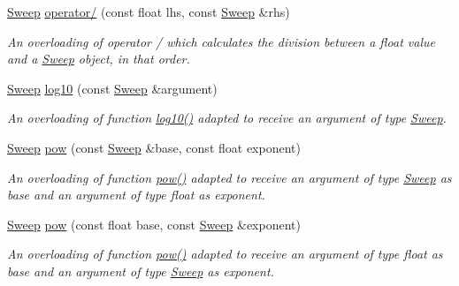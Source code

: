 \begin{DoxyCompactItemize}
\mbox{\label{structSweep_abe3c133bf246f7faebcfda286c5e1448}} 
\hyperlink{structSweep}{Sweep} \hyperlink{structSweep_abe3c133bf246f7faebcfda286c5e1448}{operator/} (const float lhs, const \hyperlink{structSweep}{Sweep} \&rhs)
\begin{DoxyCompactList}\small\item\em An overloading of operator / which calculates the division between a {\itshape float} value and a {\itshape \hyperlink{structSweep}{Sweep}} object, in that order. \end{DoxyCompactList}\item 
\mbox{\label{structSweep_a37df38f37b1cf6a6bfb18f44b706d308}} 
\hyperlink{structSweep}{Sweep} \hyperlink{structSweep_a37df38f37b1cf6a6bfb18f44b706d308}{log10} (const \hyperlink{structSweep}{Sweep} \&argument)
\begin{DoxyCompactList}\small\item\em An overloading of function {\ttfamily \hyperlink{structSweep_a37df38f37b1cf6a6bfb18f44b706d308}{log10()}} adapted to receive an argument of type {\itshape \hyperlink{structSweep}{Sweep}}. \end{DoxyCompactList}\item 
\mbox{\label{structSweep_a09ee88cfc9b28e6ec344eea1a2817ea9}} 
\hyperlink{structSweep}{Sweep} \hyperlink{structSweep_a09ee88cfc9b28e6ec344eea1a2817ea9}{pow} (const \hyperlink{structSweep}{Sweep} \&base, const float exponent)
\begin{DoxyCompactList}\small\item\em An overloading of function {\ttfamily \hyperlink{structSweep_a09ee88cfc9b28e6ec344eea1a2817ea9}{pow()}} adapted to receive an argument of type {\itshape \hyperlink{structSweep}{Sweep}} as base and an argument of type {\itshape float} as exponent. \end{DoxyCompactList}\item 
\mbox{\label{structSweep_a879ae44efd2611562d05b90b24099e70}} 
\hyperlink{structSweep}{Sweep} \hyperlink{structSweep_a879ae44efd2611562d05b90b24099e70}{pow} (const float base, const \hyperlink{structSweep}{Sweep} \&exponent)
\begin{DoxyCompactList}\small\item\em An overloading of function {\ttfamily \hyperlink{structSweep_a09ee88cfc9b28e6ec344eea1a2817ea9}{pow()}} adapted to receive an argument of type {\itshape float} as base and an argument of type {\itshape \hyperlink{structSweep}{Sweep}} as exponent. \end{DoxyCompactList}\end{DoxyCompactItemize}


